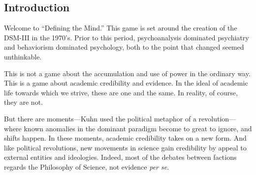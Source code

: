  \begin{refsection}
\def\mysubtitle{The struggle for legitimacy of psychology and psychiatry in the 1970’s\\ \large Instructor’s Manual}

\maketitle
\newpage
\startcontents[instructors]




% 





\renewcommand*{\thechapter}{\arabic{chapter}}


\setcounter{chapter}{0}
\mainmatter

\pagebreak 

\chapter{Introduction}
\label{introduction}

Welcome to “Defining the Mind.” This game is set around the creation of the DSM-III in the 1970’s. Prior to this period, psychoanalysis dominated psychiatry and behaviorism dominated psychology, both to the point that changed seemed unthinkable.

This is not a game about the accumulation and use of power in the ordinary way. This is a game about academic credibility and evidence. In the ideal of academic life towards which we strive, these are one and the same. In reality, of course, they are not. 

But there are moments---Kuhn used the political metaphor of a revolution---where known anomalies in the dominant paradigm become to great to ignore, and shifts happen. In these moments, academic credibility takes on a new form. And like political revolutions, new movements in science gain credibility by appeal to external entities and ideologies. Indeed, most of the debates between factions regards the Philosophy of Science, not evidence \emph{per se}.


\end{refsection}
